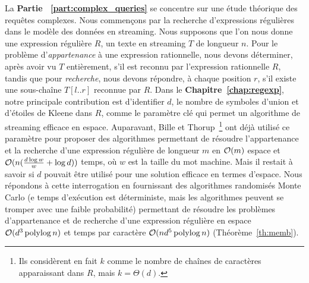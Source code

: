 La \textbf{Partie ~\ref{part:complex_queries}} se concentre sur une étude théorique des requêtes complexes.
Nous commençons par la recherche d'expressions régulières dans le modèle des données en streaming.
%
Nous supposons que l'on nous donne une expression régulière $R$, un texte en streaming $T$ de longueur $n$. Pour le problème d'\emph{appartenance} à une expression rationnelle, nous devons déterminer, après avoir vu $T$ entièrement, s'il est reconnu par l'expression rationnelle $R$, tandis que pour \emph{recherche}, nous devons répondre, à chaque position $r$, s'il existe une sous-chaîne $T[l..r]$ reconnue par $R$.
Dans le \textbf{Chapitre~\ref{chap:regexp}}, notre principale contribution est d'identifier $d$, le nombre de symboles d'union et d'étoiles de Kleene dans $R$, comme le paramètre clé qui permet un algorithme de streaming efficace en espace. 
Auparavant, Bille et Thorup~\cite{doi:10.1137/1.9781611973075.104}\footnote{Ils considèrent en fait $k$ comme le nombre de chaînes de caractères apparaissant dans $R$, mais $k=\Theta(d)$. } ont déjà utilisé ce paramètre pour proposer des algorithmes permettant de résoudre l'appartenance et la recherche d'une expression régulière de longueur $m$ en $\mathcal{O}(m)$ espace et $\mathcal{O}(n(\frac{d\log w}{w} + \log d))$ temps, où $w$ est la taille du mot machine. Mais il restait à savoir si $d$ pouvait être utilisé pour une solution efficace en termes d'espace.
%
Nous répondons à cette interrogation en fournissant des algorithmes randomisés Monte Carlo (e temps d'exécution est déterministe, mais les algorithmes peuvent se tromper avec une faible probabilité) permettant de résoudre les problèmes d'appartenance et de recherche d'une expression régulière en espace $\mathcal{O}(d^3\operatorname{polylog} n)$ et temps par caractère $\mathcal{O}(nd^5\operatorname{polylog} n)$ (Théorème~\ref{th:memb}).

